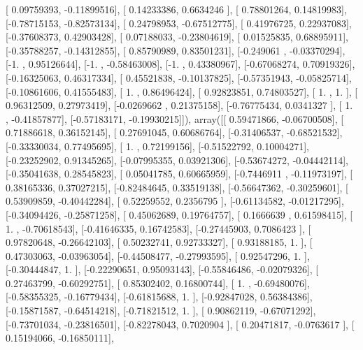 \documentclass{article}
\begin{document}
       [ 0.09759393, -0.11899516],
       [ 0.14233386,  0.6634246 ],
       [ 0.78801264,  0.14819983],
       [-0.78715153, -0.82573134],
       [ 0.24798953, -0.67512775],
       [ 0.41976725,  0.22937083],
       [-0.37608373,  0.42903428],
       [ 0.07188033, -0.23804619],
       [ 0.01525835,  0.68895911],
       [-0.35788257, -0.14312855],
       [ 0.85790989,  0.83501231],
       [-0.249061  , -0.03370294],
       [-1.        ,  0.95126644],
       [-1.        , -0.58463008],
       [-1.        ,  0.43380967],
       [-0.67068274,  0.70919326],
       [-0.16325063,  0.46317334],
       [ 0.45521838, -0.10137825],
       [-0.57351943, -0.05825714],
       [-0.10861606,  0.41555483],
       [ 1.        ,  0.86496424],
       [ 0.92823851,  0.74803527],
       [ 1.        ,  1.        ],
       [ 0.96312509,  0.27973419],
       [-0.0269662 ,  0.21375158],
       [-0.76775434,  0.0341327 ],
       [ 1.        , -0.41857877],
       [-0.57183171, -0.19930215]]), array([[ 0.59471866, -0.06700508],
       [ 0.71886618,  0.36152145],
       [ 0.27691045,  0.60686764],
       [-0.31406537, -0.68521532],
       [-0.33330034,  0.77495695],
       [ 1.        ,  0.72199156],
       [-0.51522792,  0.10004271],
       [-0.23252902,  0.91345265],
       [-0.07995355,  0.03921306],
       [-0.53674272, -0.04442114],
       [-0.35041638,  0.28545823],
       [ 0.05041785,  0.60665959],
       [-0.7446911 , -0.11973197],
       [ 0.38165336,  0.37027215],
       [-0.82484645,  0.33519138],
       [-0.56647362, -0.30259601],
       [ 0.53909859, -0.40442284],
       [ 0.52259552,  0.2356795 ],
       [-0.61134582, -0.01217295],
       [-0.34094426, -0.25871258],
       [ 0.45062689,  0.19764757],
       [ 0.1666639 ,  0.61598415],
       [ 1.        , -0.70618543],
       [-0.41646335,  0.16742583],
       [-0.27445903,  0.7086423 ],
       [ 0.97820648, -0.26642103],
       [ 0.50232741,  0.92733327],
       [ 0.93188185,  1.        ],
       [ 0.47303063, -0.03963054],
       [-0.44508477, -0.27993595],
       [ 0.92547296,  1.        ],
       [-0.30444847,  1.        ],
       [-0.22290651,  0.95093143],
       [-0.55846486, -0.02079326],
       [ 0.27463799, -0.60292751],
       [ 0.85302402,  0.16800744],
       [ 1.        , -0.69480076],
       [-0.58355325, -0.16779434],
       [-0.61815688,  1.        ],
       [-0.92847028,  0.56384386],
       [-0.15871587, -0.64514218],
       [-0.71821512,  1.        ],
       [ 0.90862119, -0.67071292],
       [-0.73701034, -0.23816501],
       [-0.82278043,  0.7020904 ],
       [ 0.20471817, -0.0763617 ],
       [ 0.15194066, -0.16850111],
\end{document}
